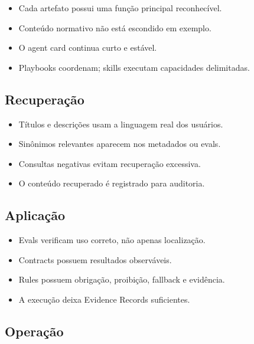 \documentclass[
  10pt,
  a4paper,
  oneside]{book}
\providecommand{\tightlist}{%
  \setlength{\itemsep}{0pt}\setlength{\parskip}{0pt}}
\begin{document}
\begin{itemize}
\tightlist
\item[$\square$]
  Cada artefato possui uma função principal reconhecível.
\item[$\square$]
  Conteúdo normativo não está escondido em exemplo.
\item[$\square$]
  O agent card continua curto e estável.
\item[$\square$]
  Playbooks coordenam; skills executam capacidades delimitadas.
\end{itemize}

\hypertarget{recuperauxe7uxe3o}{%
\subsection{Recuperação}\label{recuperauxe7uxe3o}}

\begin{itemize}
\tightlist
\item[$\square$]
  Títulos e descrições usam a linguagem real dos usuários.
\item[$\square$]
  Sinônimos relevantes aparecem nos metadados ou evals.
\item[$\square$]
  Consultas negativas evitam recuperação excessiva.
\item[$\square$]
  O conteúdo recuperado é registrado para auditoria.
\end{itemize}

\hypertarget{aplicauxe7uxe3o}{%
\subsection{Aplicação}\label{aplicauxe7uxe3o}}

\begin{itemize}
\tightlist
\item[$\square$]
  Evals verificam uso correto, não apenas localização.
\item[$\square$]
  Contracts possuem resultados observáveis.
\item[$\square$]
  Rules possuem obrigação, proibição, fallback e evidência.
\item[$\square$]
  A execução deixa Evidence Records suficientes.
\end{itemize}

\hypertarget{operauxe7uxe3o}{%
\subsection{Operação}\label{operauxe7uxe3o}}
\end{document}
